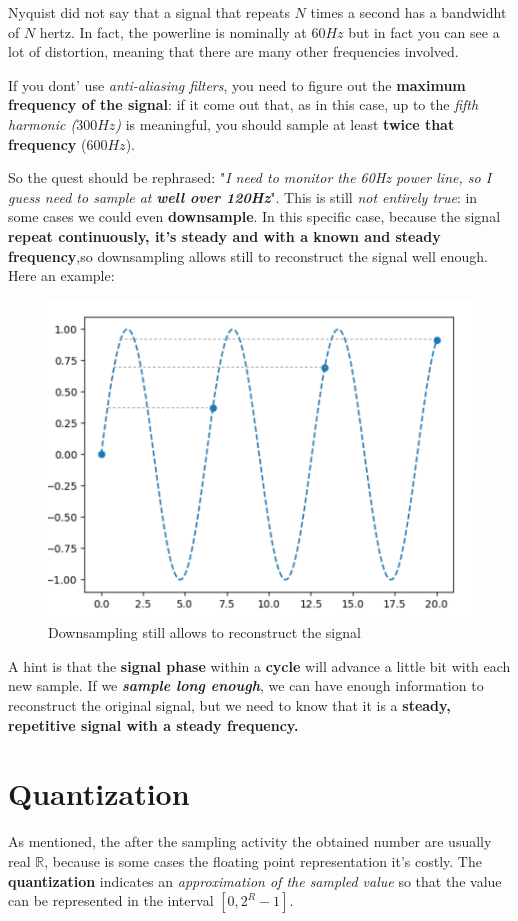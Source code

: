 \documentclass[10pt,a4paper]{report}
\theoremstyle{definition}
\begin{document}
Nyquist did not say that a signal that repeats $N$ times a second has a bandwidht of $N$ hertz.
In fact, the powerline is nominally at $60Hz$ but in fact you can see a lot of distortion, meaning that there are many other frequencies involved.

If you dont' use \textit{anti-aliasing filters}, you need to figure out the \textbf{maximum frequency of the signal}: if it come out that, as in this case, up to the \textit{fifth harmonic ($300Hz$)} is meaningful, you should sample at least \textbf{twice that frequency} ($600Hz$).

So the quest should be rephrased: "\textit{I need to monitor the 60Hz power line, so I guess need to sample at \textbf{well over 120Hz}}".
This is still \textit{not entirely true}: in some cases we could even \textbf{downsample}. In this specific case, because the signal \textbf{repeat continuously, it's steady and with a known and steady frequency},so downsampling allows still to reconstruct the signal well enough.
Here an example:
\begin{figure}[h]
	\centering\includegraphics[scale=0.50]{images/Pasted image 20230526140651.png}
	\caption{Downsampling still allows to reconstruct the signal}
\end{figure}

A hint is that the \textbf{signal phase} within a \textbf{cycle} will advance a little bit with each new sample. If we \textit{\textbf{sample long enough}}, we can have enough information to reconstruct the original signal, but we need to know that it is a \textbf{steady, repetitive signal with a steady frequency.}
\section{Quantization}\label{sec:quantization}
As mentioned, the after the sampling activity the obtained number are usually real $\mathbb{R}$, because is some cases the floating point representation it's costly.
The \textbf{quantization} indicates an \textit{approximation of the sampled value} so that the value can be represented in the interval $[0,2^{R}-1]$.
\end{document}
